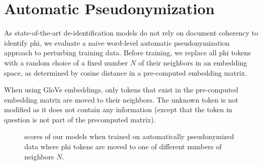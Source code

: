 
\section{Automatic Pseudonymization}\label{sec:automatic-pseudonymization}
%
As state-of-the-art de-identification models do not rely on document coherency to identify \ac{phi}, we evaluate a naive word-level automatic pseudonymization approach to perturbing training data.
%
Before training, we replace all \ac{phi} tokens with a random choice of a fixed number $N$ of their neighbors in an embedding space, as determined by cosine distance in a pre-computed embedding matrix.

%
When using GloVe embeddings, only tokens that exist in the pre-computed embedding matrix are moved to their neighbors.
%
The unknown token is not modified as it does not contain any information (except that the token in question is not part of the precomputed matrix).

\begin{figure}
    \centering
    
    \caption[De-identification with automatic pseudonymization]{\fone scores of our models when trained on automatically pseudonymized data where \ac{phi} tokens are moved to one of different numbers of neighbors $N$.}\label{fig:auto-pseudo}
\end{figure}